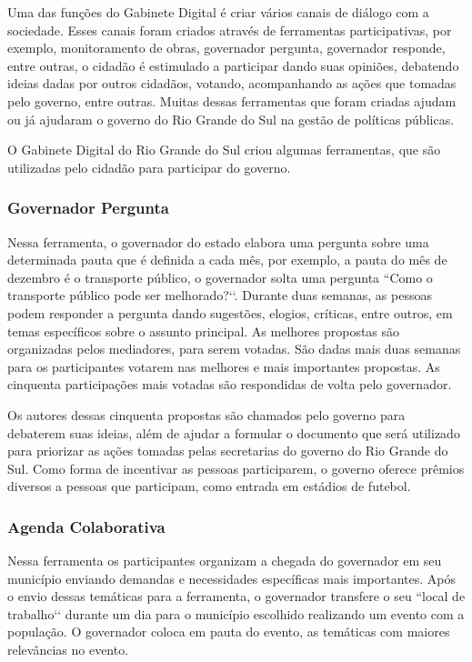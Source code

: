 Uma das funções do Gabinete Digital é criar vários canais de diálogo com a sociedade. Esses canais foram criados através de ferramentas participativas, por exemplo, monitoramento de obras, governador pergunta, governador responde, entre outras, o cidadão é estimulado a participar dando suas opiniões, debatendo ideias dadas por outros cidadãos, votando, acompanhando as ações que tomadas pelo governo, entre outras. Muitas dessas ferramentas que foram criadas ajudam ou já ajudaram o governo do Rio Grande do Sul na gestão de políticas públicas.

O Gabinete Digital do Rio Grande do Sul criou algumas ferramentas, que são utilizadas pelo cidadão para participar do governo.

\subsubsection*{Governador Pergunta}

Nessa ferramenta, o governador do estado elabora uma pergunta sobre uma determinada pauta que é definida a cada mês, por exemplo, a pauta do mês de dezembro é o transporte público, o governador solta uma pergunta ``Como o transporte público pode ser melhorado?‘‘. Durante duas semanas, as pessoas podem responder a pergunta dando sugestões, elogios, críticas, entre outros, em temas específicos sobre o assunto principal. As melhores propostas são organizadas pelos mediadores, para serem votadas. São dadas mais duas semanas para os participantes votarem nas melhores e mais importantes propostas. As cinquenta participações mais votadas são respondidas de volta pelo governador.

Os autores dessas cinquenta propostas são chamados pelo governo para debaterem suas ideias, além de ajudar a formular o documento que será utilizado para priorizar as ações tomadas pelas secretarias do governo do Rio Grande do Sul. Como forma de incentivar as pessoas participarem, o governo oferece prêmios diversos a pessoas que participam, como entrada em estádios de futebol. 

\subsubsection*{Agenda Colaborativa}
	
Nessa ferramenta os participantes organizam a chegada do governador em seu município enviando demandas e necessidades específicas mais importantes. Após o envio dessas temáticas para a ferramenta, o governador transfere o seu ``local de trabalho‘‘  durante um dia para o município escolhido realizando um evento com a população. O governador coloca em pauta do evento, as temáticas com maiores relevâncias no evento.

